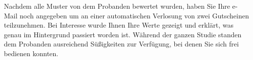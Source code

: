 Nachdem alle Muster von dem Probanden bewertet wurden, haben Sie Ihre e-Mail noch angegeben um an einer automatischen Verlosung von zwei Gutscheinen teilzunehmen. Bei Interesse wurde Ihnen Ihre Werte gezeigt und erkl{\"a}rt, was genau im Hintergrund passiert worden ist. W{\"a}hrend der ganzen Studie standen dem Probanden ausreichend S{\"u}{\ss}igkeiten zur Verf{\"u}gung, bei denen Sie sich frei bedienen konnten.

